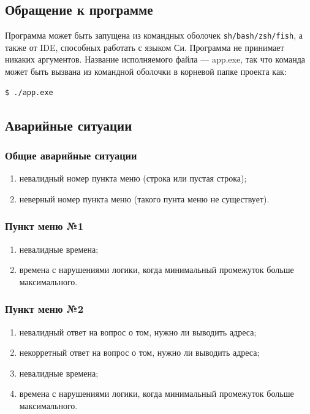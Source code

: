 \documentclass[a4paper,12pt]{extarticle}
\begin{document}
\subsection{Обращение к программе}
Программа может быть запущена из командных оболочек \texttt{sh/bash/zsh/fish}, а также от IDE, способных работать с языком Си. Программа не принимает никаких аргументов. Название исполняемого файла --- app.exe, так что команда может быть вызвана из командной оболочки в корневой папке проекта как:

\begin{verbatim}
$ ./app.exe
\end{verbatim}

\subsection{Аварийные ситуации}
\subsubsection{Общие аварийные ситуации}
\begin{enumerate}
    \item невалидный номер пункта меню (строка или пустая строка);
    \item неверный номер пункта меню (такого пунта меню не существует).
\end{enumerate}

\subsubsection{Пункт меню №1}
\begin{enumerate}
    \item невалидные времена;
    \item времена с нарушениями логики, когда минимальный промежуток больше максимального.
\end{enumerate}

\subsubsection{Пункт меню №2}
\begin{enumerate}
    \item невалидный ответ на вопрос о том, нужно ли выводить адреса;
    \item некорретный ответ на вопрос о том, нужно ли выводить адреса;
    \item невалидные времена;
    \item времена с нарушениями логики, когда минимальный промежуток больше максимального.
\end{enumerate}
\end{document}
